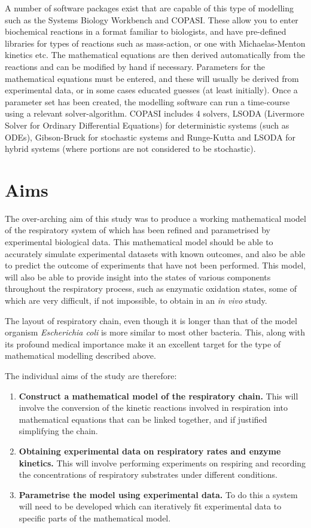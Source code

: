 A number of software packages exist that are capable of this type of modelling such as the Systems Biology Workbench\cite{Sauro2003} and COPASI\cite{Hoops2006}. These allow you to enter biochemical reactions in a format familiar to biologists, and have pre-defined libraries for types of reactions such as mass-action, or one with Michaelas-Menton kinetics etc. The mathematical equations are then derived automatically from the reactions and can be modified by hand if necessary. Parameters for the mathematical equations must be entered, and these will usually be derived from experimental data, or in some cases educated guesses (at least initially). Once a parameter set has been created, the modelling software can run a time-course using a relevant solver-algorithm. COPASI includes 4 solvers,  LSODA (Livermore Solver for Ordinary Differential Equations)\cite{Radhakrishnan1993} for deterministic systems (such as ODEs), Gibson-Bruck\cite{Gibson2000} for stochastic systems and Runge-Kutta and LSODA for hybrid systems (where portions are not considered to be stochastic).

\section{Aims}
The over-arching aim of this study was to produce a working mathematical model of the respiratory system of \Nm{} which has been refined and parametrised by experimental biological data. This mathematical model should be able to accurately simulate experimental datasets with known outcomes, and also be able to predict the outcome of experiments that have not been performed. This model, will also be able to provide insight into the states of various components throughout the respiratory process, such as enzymatic oxidation states, some of which are very difficult, if not impossible, to obtain in an \textit{in vivo} study.

The layout of \Nm{} respiratory chain, even though it is longer than that of the model organism \textit{Escherichia coli} is more similar to most other bacteria. This, along with its profound medical importance make it an excellent target for the type of mathematical modelling described above.

The individual aims of the study are therefore:
\begin{enumerate}
\item {\bf Construct a mathematical model of the \Nm{} respiratory chain.} This will involve the conversion of the kinetic reactions involved in respiration into mathematical equations that can be linked together, and if justified simplifying the chain.
\item {\bf Obtaining experimental data on respiratory rates and enzyme kinetics.} This will involve performing experiments on respiring \Nm{} and recording the concentrations of respiratory substrates under different conditions.
\item {\bf Parametrise the model using experimental data.} To do this a system will need to be developed which can iteratively fit experimental data to specific parts of the mathematical model.
\end{enumerate}